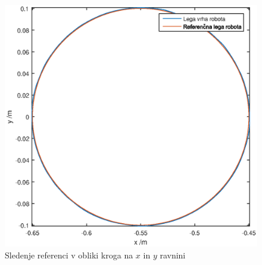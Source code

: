 \begin{figure}
	\centering
	\includegraphics[scale=0.5]{./Slike/follow_circle.eps}
	\caption{Sledenje referenci v obliki kroga na $x$ in $y$ ravnini}
	\label{fig:follow_circle}
\end{figure}
